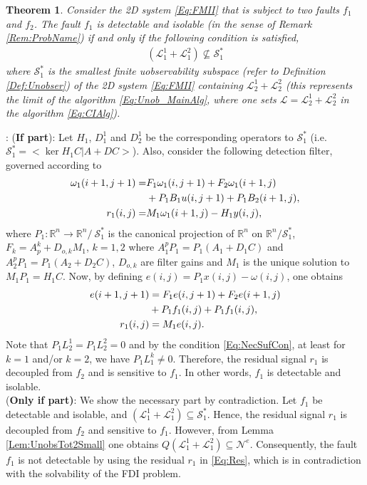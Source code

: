 \documentclass[journal,12pt,draftcls,onecolumn]{IEEEtran}
\newcommand{\ssp}[1]{\mathscr{#1}}      \newcommand{\setssp}[1]{\mathfrak{#1}}   \newcommand{\fld}[1]{\mathbb{#1}}       \newcommand{\op}[1]{\mathcal{#1}}       \newcommand{\sumbanach}[1]{\sum{#1}}
\def\QEDclosed{\hfill\IEEEQEDclosed}
\renewcommand{\qed}{\QEDclosed}
\renewenvironment{proof}[1][\proofname]{\noindent\nobreakspace{\bfseries #1}:\;}{\qed\par}
\newtheorem{theorem}{Theorem}
\begin{document}
\begin{theorem}\label{Thm:NecSuffFDI}
	Consider the 2D system \eqref{Eq:FMII} that is subject to two faults $f_1$ and $f_2$. The fault $f_1$  is detectable and isolable (in the sense of Remark \ref{Rem:ProbName}) if and only if the following condition is satisfied,
	\begin{equation}\label{Eq:NecSufCon}
	\begin{split}
	(\ssp{L}_1^{1}+\ssp{L}_1^{2})\not\subseteq\op{S}_1^*
	\end{split}
	\end{equation}
	where  $\op{S}_1^*$ is the smallest finite uobservability subspace (refer to Definition \ref{Def:Unobser}) of the 2D system \eqref{Eq:FMII} containing $\ssp{L}_2^1+\ssp{L}_2^2$ (this represents the limit of the algorithm \eqref{Eq:Unob_MainAlg}, where one sets $\ssp{L}=\ssp{L}_2^1+\ssp{L}_2^2$ in the algorithm \eqref{Eq:CIAlg}).\qed
\end{theorem}
\begin{proof}
	({\bf If part}): Let $H_1$, $D_1^1$ and $D_2^1$ be the corresponding operators to $\op{S}_1^*$ (i.e. $\op{S}_1^* = <\ker H_1C|A+DC>$). Also, consider the following detection filter, governed according to 
		\begin{align}\label{Eq:Filter_F1}
		\omega_1(i+1,j+1) = & F_1\omega_1(i,j+1)+F_2\omega_1(i+1,j)\notag\\&+P_1B_1u(i,j+1)+P_1B_2(i+1,j),\notag\\
		r_1(i,j) = &M_1\omega_1(i+1,j)-H_1y(i,j),
		\end{align}
		where $P_1: \mathbb{R}^{n}\rightarrow \mathbb{R}^{n}/\ \op{S}_1^*$ is the canonical projection of $\fld{R}^n$ on $\fld{R}^n/\op{S}_1^*$, $F_k = A_p^k+D_{o,k}M_1$, $k=1,2$ where $A_1^pP_1 = P_1(A_1+D_1C)$ and $A_2^pP_1 = P_1(A_2+D_2C)$, $D_{o,k}$ are filter gains  and $M_1$ is the unique solution to $M_1P_1 = H_1C$.
		Now, by defining $e(i,j) = P_1x(i,j)-\omega(i,j)$, one obtains
		\begin{align}\label{Eq:Res}
		e(i+1,j+1) &= F_1e(i,j+1)+F_2e(i+1,j)\notag\\&+P_1f_1(i,j)+P_1f_1(i,j),\notag\\
		r_1(i,j) &= M_1e(i,j).
		\end{align}
		Note that $P_1L_2^1 = P_1L_2^2 = 0$ and by the condition \eqref{Eq:NecSufCon}, at least for $k=1$ and/or $k=2$, we have $P_1L_1^k\neq0$. Therefore, the residual signal $r_1$ is decoupled from $f_2$ and is sensitive to $f_1$. In other words, $f_1$ is detectable and isolable.\\
		{(\bf Only if part)}: We show the necessary part by contradiction. Let $f_1$ be detectable and isolable, and $(\ssp{L}_1^{1}+\ssp{L}_1^{2})\subseteq\op{S}_1^*$. Hence, the residual signal $r_1$ is decoupled from $f_2$ and sensitive to $f_1$. However, from Lemma \ref{Lem:UnobsTot2Small} one obtains $Q(\ssp{L}_1^{1}+\ssp{L}_1^{2})\subseteq\ssp{N}^e$. Consequently, the fault $f_1$ is not detectable by using the residual $r_1$ in \eqref{Eq:Res}, which is in contradiction with the solvability of the FDI problem. 
\end{proof}
\end{document}
